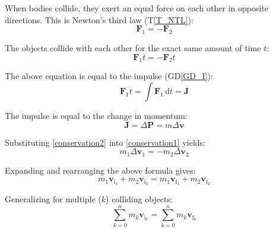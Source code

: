 \documentclass[12pt]{article}
\newcommand{\dt}{\mathrm{d}t}
\begin{document}
When bodies collide, they exert an equal force on each other in opposite
directions. This is Newton's third law (T\ref{T_NTL}):
\begin{equation*}
\mathbf{F}_1 = - \mathbf{F}_2
\end{equation*}

\noindent
The objects collide with each other for the exact same amount of time $t$:
\begin{equation}
\mathbf{F}_1t = - \mathbf{F}_2t \label{conservation1}
\end{equation}

\noindent
The above equation is equal to the impulse (GD\ref{GD_I}):
\begin{equation*}
\mathbf{F}_1t = \int \mathbf{F}_1 \, \dt = \mathbf{J}
\end{equation*}

\noindent
The impulse is equal to the change in momentum: 
\begin{equation}
\mathbf{J}= \Delta\mathbf{P} = m\Delta\mathbf{v} \label{conservation2}
\end{equation}

\noindent
Substituting \ref{conservation2} into \ref{conservation1} yields:
\begin{equation*}
m_1\Delta\mathbf{v}_1 = -m_2\Delta\mathbf{v}_2
\end{equation*}

\noindent
Expanding and rearranging the above formula gives:
\begin{equation*}
m_1\mathbf{v}_{\text{i}_1} + m_2\mathbf{v}_{\text{i}_2} = m_1\mathbf{v}_{\text{f}_1} + m_2\mathbf{v}_{\text{f}_2}
\end{equation*}

\noindent
Generalizing for multiple ($k$) colliding objects: 
\begin{equation*}
\sum_{k=0}^{n} m_k\mathbf{v}_{\text{i}_k} = \sum_{k=0}^{n} m_k\mathbf{v}_{\text{f}_k}
\end{equation*}

\end{document}
